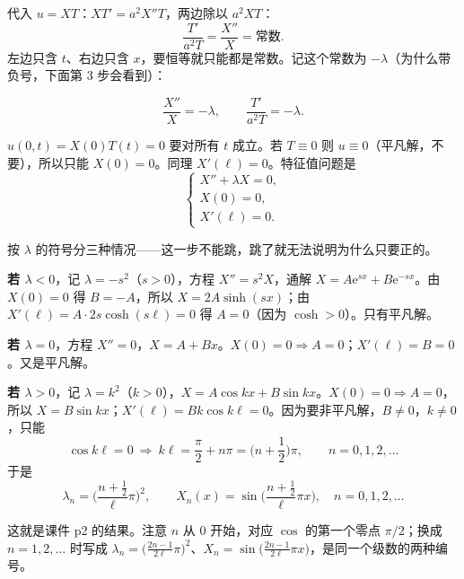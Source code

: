 代入 $u=XT$：$X T'=a^2X''T$，两边除以 $a^2XT$：
\begin{equation}
  \frac{T'}{a^2T}=\frac{X''}{X}=\text{常数}.
\end{equation}
左边只含 $t$、右边只含 $x$，要恒等就只能都是常数。记这个常数为 $-\lambda$（为什么带负号，下面第 3 步会看到）：

\begin{equation}
  \frac{X''}{X}=-\lambda,\qquad \frac{T'}{a^2T}=-\lambda .
\end{equation}

$u(0,t)=X(0)T(t)=0$ 要对所有 $t$ 成立。若 $T\equiv0$ 则 $u\equiv0$（平凡解，不要），所以只能 $X(0)=0$。同理 $X'(\ell)=0$。特征值问题是
\begin{equation}
  \begin{cases}
    X''+\lambda X=0,\\
    X(0)=0,\\
    X'(\ell)=0 .
  \end{cases}
\end{equation}

按 $\lambda$ 的符号分三种情况——这一步不能跳，跳了就无法说明为什么只要正的。

\textbf{若 $\lambda<0$}，记 $\lambda=-s^2$（$s>0$），方程 $X''=s^2X$，通解 $X=A\mathrm e^{sx}+B\mathrm e^{-sx}$。由 $X(0)=0$ 得 $B=-A$，所以 $X=2A\sinh(sx)$；由 $X'(\ell)=A\cdot2s\cosh(s\ell)=0$ 得 $A=0$（因为 $\cosh>0$）。只有平凡解。

\textbf{若 $\lambda=0$}，方程 $X''=0$，$X=A+Bx$。$X(0)=0\Rightarrow A=0$；$X'(\ell)=B=0$。又是平凡解。

\textbf{若 $\lambda>0$}，记 $\lambda=k^2$（$k>0$），$X=A\cos kx+B\sin kx$。$X(0)=0\Rightarrow A=0$，所以 $X=B\sin kx$；$X'(\ell)=Bk\cos k\ell=0$。因为要非平凡解，$B\neq0$，$k\neq0$，只能
\begin{equation}
  \cos k\ell=0\ \Longrightarrow\ k\ell=\frac{\pi}{2}+n\pi=\Big(n+\frac12\Big)\pi,\qquad n=0,1,2,\dots
\end{equation}
于是
\begin{equation}
  \boxed{\;\lambda_n=\Big(\frac{n+\frac12}{\ell}\pi\Big)^2,\qquad
  X_n(x)=\sin\Big(\frac{n+\frac12}{\ell}\pi x\Big),\quad n=0,1,2,\dots\;}
\end{equation}

这就是课件 p2 的结果。注意 $n$ 从 $0$ 开始，对应 $\cos$ 的第一个零点 $\pi/2$；换成 $n=1,2,\dots$ 时写成 $\lambda_n=\big(\frac{2n-1}{2\ell}\pi\big)^2$、$X_n=\sin\big(\frac{2n-1}{2\ell}\pi x\big)$，是同一个级数的两种编号。

